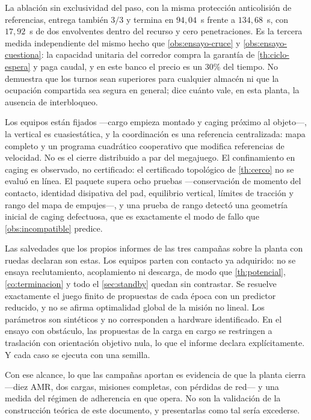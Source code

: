 \begin{observacion}
\label{obs:mixed2d-exclusividad}
La ablación sin exclusividad del paso, con la misma protección anticolisión
de referencias, entrega también $3/3$ y termina en $94{,}04$~s frente a
$134{,}68$~s, con $17{,}92$~s de dos envolventes dentro del recurso y cero
penetraciones. Es la tercera medida independiente del mismo hecho que
\cref{obs:ensayo-cruce} y \cref{obs:ensayo-cuestiona}: la capacidad unitaria
del corredor compra la garantía de \cref{th:ciclo-espera} y paga caudal, y
en este banco el precio es un $30\%$ del tiempo. No demuestra que los turnos
sean superiores para cualquier almacén ni que la ocupación compartida sea
segura en general; dice cuánto vale, en esta planta, la ausencia de
interbloqueo.
\end{observacion}

\begin{observacion}
\label{obs:mixed2d-alcance}
Los equipos están fijados —\textsf{cargo} empieza montado y \textsf{caging}
próximo al objeto—, la vertical es cuasiestática, y la coordinación es una
referencia centralizada: mapa completo y un programa cuadrático cooperativo que
modifica referencias de velocidad. No es el cierre distribuido a par del
megajuego. El confinamiento en \textsf{caging} es observado, no certificado:
el certificado topológico de \cref{th:cerco} no se evaluó en línea. El
paquete supera ocho pruebas —conservación de momento del contacto, identidad
disipativa del pad, equilibrio vertical, límites de tracción y rango del mapa
de empujes—, y una prueba de rango detectó una geometría inicial de
\textsf{caging} defectuosa, que es exactamente el modo de fallo que
\cref{obs:incompatible} predice.
\end{observacion}

\begin{observacion}
\label{obs:ensayos-alcance}
Las salvedades que los propios informes de las tres campañas sobre la planta con ruedas declaran son estas. Los equipos
parten con contacto ya adquirido: no se ensaya reclutamiento, acoplamiento ni
descarga, de modo que \cref{th:potencial}, \cref{co:terminacion} y todo el
\cref{sec:standby} quedan sin contrastar. Se resuelve exactamente el juego finito
de propuestas de cada época con un predictor reducido, y no se afirma optimalidad
global de la misión no lineal. Los parámetros son sintéticos y no corresponden a
hardware identificado. En el ensayo con obstáculo, las propuestas de la carga en
\textsf{cargo} se restringen a traslación con orientación objetivo nula, lo que el
informe declara explícitamente. Y cada caso se ejecuta con una semilla.

Con ese alcance, lo que las campañas aportan es evidencia de que la planta cierra
—diez AMR, dos cargas, misiones completas, con pérdidas de red— y una medida del
régimen de adherencia en que opera. No son la validación de la construcción
teórica de este documento, y presentarlas como tal sería excederse.
\end{observacion}
